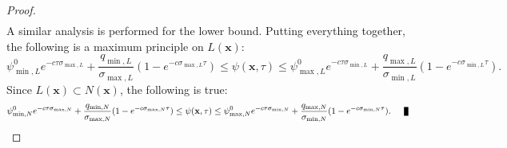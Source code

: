 \begin{proof}
\begin{eqnarray*}
   \end{eqnarray*}
   A similar analysis is performed for the lower bound. Putting everything together,
   the following is a maximum principle on $L(\mathbf{x})$:
   \[
      \psi_{\min,L}^0 e^{-c\tau\sigma_{\max,L}} + 
            \frac{q_{\min,L}}{\sigma_{\max,L}}(1 - e^{-c\sigma_{\max,L}\tau})
      \le\psi(\mathbf{x},\tau)\le
      \psi_{\max,L}^0 e^{-c\tau\sigma_{\min,L}} + 
            \frac{q_{\max,L}}{\sigma_{\min,L}}(1 - e^{-c\sigma_{\min,L}\tau}).
   \]
   Since $L(\mathbf{x})\subset N(\mathbf{x})$, the following is true:
   \[
      \psi_{\min,N}^0 e^{-c\tau\sigma_{\max,N}} + 
            \frac{q_{\min,N}}{\sigma_{\max,N}}(1 - e^{-c\sigma_{\max,N}\tau})
      \le\psi(\mathbf{x},\tau)\le
      \psi_{\max,N}^0 e^{-c\tau\sigma_{\min,N}} + 
            \frac{q_{\max,N}}{\sigma_{\min,N}}(1 - e^{-c\sigma_{\min,N}\tau}).\qed
   \]
\end{proof}
